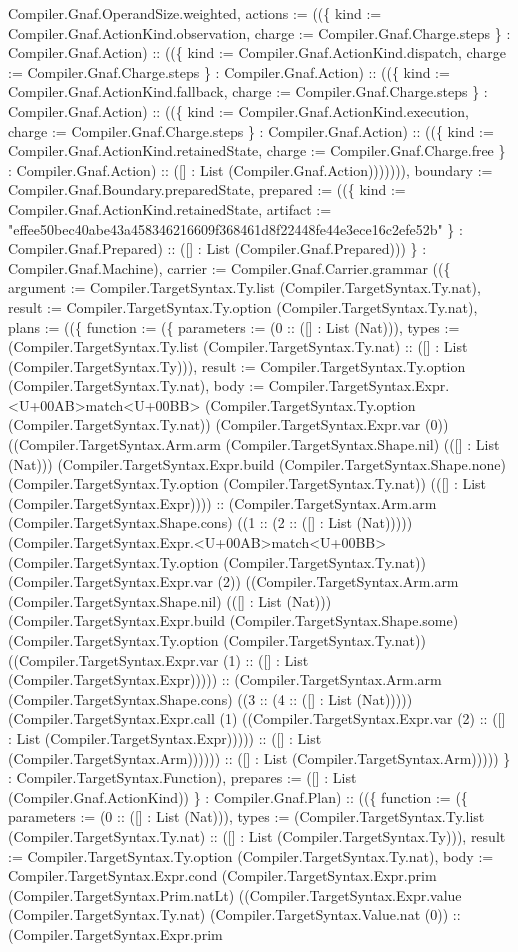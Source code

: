 \documentclass[11pt]{article}
\begin{document}
Compiler.Gnaf.OperandSize.weighted, actions := ((\{ kind := Compiler.Gnaf.ActionKind.observation, charge := Compiler.Gnaf.Charge.steps \} : Compiler.Gnaf.Action) :: ((\{ kind := Compiler.Gnaf.ActionKind.dispatch, charge := Compiler.Gnaf.Charge.steps \} : Compiler.Gnaf.Action) :: ((\{ kind := Compiler.Gnaf.ActionKind.fallback, charge := Compiler.Gnaf.Charge.steps \} : Compiler.Gnaf.Action) :: ((\{ kind := Compiler.Gnaf.ActionKind.execution, charge := Compiler.Gnaf.Charge.steps \} : Compiler.Gnaf.Action) :: ((\{ kind := Compiler.Gnaf.ActionKind.retainedState, charge := Compiler.Gnaf.Charge.free \} : Compiler.Gnaf.Action) :: ([] : List (Compiler.Gnaf.Action))))))), boundary := Compiler.Gnaf.Boundary.preparedState, prepared := ((\{ kind := Compiler.Gnaf.ActionKind.retainedState, artifact := "effee50bec40abe43a458346216609f368461d8f22448fe44e3ece16c2efe52b" \} : Compiler.Gnaf.Prepared) :: ([] : List (Compiler.Gnaf.Prepared))) \} : Compiler.Gnaf.Machine), carrier := Compiler.Gnaf.Carrier.grammar ((\{ argument := Compiler.TargetSyntax.Ty.list (Compiler.TargetSyntax.Ty.nat), result := Compiler.TargetSyntax.Ty.option (Compiler.TargetSyntax.Ty.nat), plans := ((\{ function := (\{ parameters := (0 :: ([] : List (Nat))), types := (Compiler.TargetSyntax.Ty.list (Compiler.TargetSyntax.Ty.nat) :: ([] : List (Compiler.TargetSyntax.Ty))), result := Compiler.TargetSyntax.Ty.option (Compiler.TargetSyntax.Ty.nat), body := Compiler.TargetSyntax.Expr.<U+00AB>match<U+00BB> (Compiler.TargetSyntax.Ty.option (Compiler.TargetSyntax.Ty.nat)) (Compiler.TargetSyntax.Expr.var (0)) ((Compiler.TargetSyntax.Arm.arm (Compiler.TargetSyntax.Shape.nil) (([] : List (Nat))) (Compiler.TargetSyntax.Expr.build (Compiler.TargetSyntax.Shape.none) (Compiler.TargetSyntax.Ty.option (Compiler.TargetSyntax.Ty.nat)) (([] : List (Compiler.TargetSyntax.Expr)))) :: (Compiler.TargetSyntax.Arm.arm (Compiler.TargetSyntax.Shape.cons) ((1 :: (2 :: ([] : List (Nat))))) (Compiler.TargetSyntax.Expr.<U+00AB>match<U+00BB> (Compiler.TargetSyntax.Ty.option (Compiler.TargetSyntax.Ty.nat)) (Compiler.TargetSyntax.Expr.var (2)) ((Compiler.TargetSyntax.Arm.arm (Compiler.TargetSyntax.Shape.nil) (([] : List (Nat))) (Compiler.TargetSyntax.Expr.build (Compiler.TargetSyntax.Shape.some) (Compiler.TargetSyntax.Ty.option (Compiler.TargetSyntax.Ty.nat)) ((Compiler.TargetSyntax.Expr.var (1) :: ([] : List (Compiler.TargetSyntax.Expr))))) :: (Compiler.TargetSyntax.Arm.arm (Compiler.TargetSyntax.Shape.cons) ((3 :: (4 :: ([] : List (Nat))))) (Compiler.TargetSyntax.Expr.call (1) ((Compiler.TargetSyntax.Expr.var (2) :: ([] : List (Compiler.TargetSyntax.Expr))))) :: ([] : List (Compiler.TargetSyntax.Arm)))))) :: ([] : List (Compiler.TargetSyntax.Arm))))) \} : Compiler.TargetSyntax.Function), prepares := ([] : List (Compiler.Gnaf.ActionKind)) \} : Compiler.Gnaf.Plan) :: ((\{ function := (\{ parameters := (0 :: ([] : List (Nat))), types := (Compiler.TargetSyntax.Ty.list (Compiler.TargetSyntax.Ty.nat) :: ([] : List (Compiler.TargetSyntax.Ty))), result := Compiler.TargetSyntax.Ty.option (Compiler.TargetSyntax.Ty.nat), body := Compiler.TargetSyntax.Expr.cond (Compiler.TargetSyntax.Expr.prim (Compiler.TargetSyntax.Prim.natLt) ((Compiler.TargetSyntax.Expr.value (Compiler.TargetSyntax.Ty.nat) (Compiler.TargetSyntax.Value.nat (0)) :: (Compiler.TargetSyntax.Expr.prim 
\end{document}

